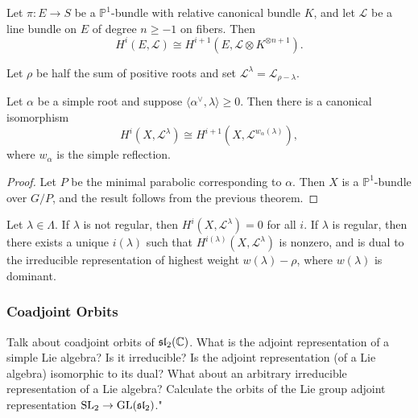 \documentclass[12pt]{article}
\begin{document}
\begin{theorem}
    Let $\pi : E \to S$ be a $\mathbb P^1$-bundle with relative canonical bundle $K$, and let $\mathcal L$ be a line bundle on $E$ of degree $n \ge -1$ on fibers. Then
    \[
        H^i(E,\mathcal L) \cong H^{i+1}(E,\mathcal L \otimes K^{\otimes n+1}).
    \]
\end{theorem}

Let $\rho$ be half the sum of positive roots and set $\mathcal L^\lambda = \mathcal L_{\rho-\lambda}$.

\begin{lemma}
    Let $\alpha$ be a simple root and suppose $\langle \alpha^\vee,\lambda\rangle \ge 0$. Then there is a canonical isomorphism
    \[
        H^i(X,\mathcal L^\lambda) \cong H^{i+1}(X,\mathcal L^{w_\alpha(\lambda)}),
    \]
    where $w_\alpha$ is the simple reflection.
\end{lemma}

\begin{proof}
    Let $P$ be the minimal parabolic corresponding to $\alpha$. Then $X$ is a $\mathbb P^1$-bundle over $G/P$, and the result follows from the previous theorem.
\end{proof}

\begin{theorem}
    Let $\lambda \in \Lambda$. If $\lambda$ is not regular, then $H^i(X,\mathcal L^\lambda)=0$ for all $i$. If $\lambda$ is regular, then there exists a unique $i(\lambda)$ such that $H^{i(\lambda)}(X,\mathcal L^\lambda)$ is nonzero, and is dual to the irreducible representation of highest weight $w(\lambda)-\rho$, where $w(\lambda)$ is dominant.
\end{theorem}

\subsubsection{Coadjoint Orbits}

\begin{exercise}
    Talk about coadjoint orbits of $\mathfrak{sl}_2(\mathbb C)$.
    What is the adjoint representation of a simple Lie algebra? Is it irreducible?
    Is the adjoint representation (of a Lie algebra) isomorphic to its dual? What about an arbitrary irreducible representation of a Lie algebra?
    Calculate the orbits of the Lie group adjoint representation $\operatorname{SL}_2 \rightarrow \operatorname{GL}(\mathfrak{sl}_2)$."
\end{exercise}
\end{document}
